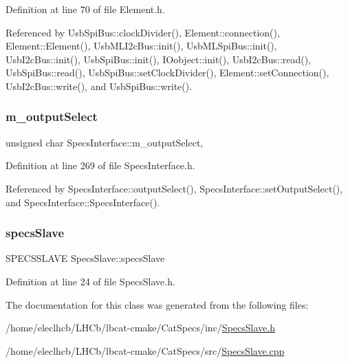 Definition at line 70 of file Element.\+h.



Referenced by Usb\+Spi\+Bus\+::clock\+Divider(), Element\+::connection(), Element\+::\+Element(), Usb\+M\+L\+I2c\+Bus\+::init(), Usb\+M\+L\+Spi\+Bus\+::init(), Usb\+I2c\+Bus\+::init(), Usb\+Spi\+Bus\+::init(), I\+Oobject\+::init(), Usb\+I2c\+Bus\+::read(), Usb\+Spi\+Bus\+::read(), Usb\+Spi\+Bus\+::set\+Clock\+Divider(), Element\+::set\+Connection(), Usb\+I2c\+Bus\+::write(), and Usb\+Spi\+Bus\+::write().

\mbox{\label{classSpecsInterface_a660cb4112ce1c071f277cb6ec115b411}} 
\subsubsection{\texorpdfstring{m\+\_\+output\+Select}{m\_outputSelect}}
{\footnotesize\ttfamily unsigned char Specs\+Interface\+::m\+\_\+output\+Select\hspace{0.3cm}{\ttfamily [protected]}, {\ttfamily [inherited]}}



Definition at line 269 of file Specs\+Interface.\+h.



Referenced by Specs\+Interface\+::output\+Select(), Specs\+Interface\+::set\+Output\+Select(), and Specs\+Interface\+::\+Specs\+Interface().

\mbox{\label{classSpecsSlave_a98f0190d671023c3d874088ea2bd874b}} 
\subsubsection{\texorpdfstring{specs\+Slave}{specsSlave}}
{\footnotesize\ttfamily S\+P\+E\+C\+S\+S\+L\+A\+VE Specs\+Slave\+::specs\+Slave\hspace{0.3cm}{\ttfamily [private]}}



Definition at line 24 of file Specs\+Slave.\+h.



The documentation for this class was generated from the following files\+:\begin{DoxyCompactItemize}
\item 
/home/eleclhcb/\+L\+H\+Cb/lbcat-\/cmake/\+Cat\+Specs/inc/\hyperlink{SpecsSlave_8h}{Specs\+Slave.\+h}\item 
/home/eleclhcb/\+L\+H\+Cb/lbcat-\/cmake/\+Cat\+Specs/src/\hyperlink{SpecsSlave_8cpp}{Specs\+Slave.\+cpp}\end{DoxyCompactItemize}
